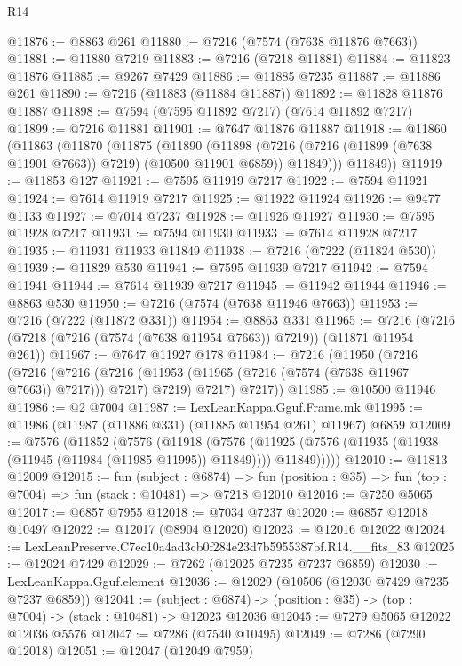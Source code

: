 \begin{lexlean}{R14}
\begin{coremodule}
@11876 := @8863 @261
@11880 := @7216 (@7574 (@7638 @11876 @7663))
@11881 := @11880 @7219
@11883 := @7216 (@7218 @11881)
@11884 := @11823 @11876
@11885 := @9267 @7429
@11886 := @11885 @7235
@11887 := @11886 @261
@11890 := @7216 (@11883 (@11884 @11887))
@11892 := @11828 @11876 @11887
@11898 := @7594 (@7595 @11892 @7217) (@7614 @11892 @7217)
@11899 := @7216 @11881
@11901 := @7647 @11876 @11887
@11918 := @11860
    (@11863
      (@11870
        (@11875
          (@11890
            (@11898
              (@7216 (@7216 (@11899 (@7638 @11901 @7663)) @7219) (@10500 @11901 @6859))
              @11849)))
        @11849))
@11919 := @11853 @127
@11921 := @7595 @11919 @7217
@11922 := @7594 @11921
@11924 := @7614 @11919 @7217
@11925 := @11922 @11924
@11926 := @9477 @1133
@11927 := @7014 @7237
@11928 := @11926 @11927
@11930 := @7595 @11928 @7217
@11931 := @7594 @11930
@11933 := @7614 @11928 @7217
@11935 := @11931 @11933 @11849
@11938 := @7216 (@7222 (@11824 @530))
@11939 := @11829 @530
@11941 := @7595 @11939 @7217
@11942 := @7594 @11941
@11944 := @7614 @11939 @7217
@11945 := @11942 @11944
@11946 := @8863 @530
@11950 := @7216 (@7574 (@7638 @11946 @7663))
@11953 := @7216 (@7222 (@11872 @331))
@11954 := @8863 @331
@11965 := @7216 (@7216 (@7218 (@7216 (@7574 (@7638 @11954 @7663)) @7219)) (@11871 @11954 @261))
@11967 := @7647 @11927 @178
@11984 := @7216
    (@11950
      (@7216
        (@7216
          (@7216 (@7216 (@11953 (@11965 (@7216 (@7574 (@7638 @11967 @7663)) @7217))) @7217) @7219)
          @7217)
        @7217))
@11985 := @10500 @11946
@11986 := @2 @7004
@11987 := LexLeanKappa.Gguf.Frame.mk
@11995 := @11986 (@11987 (@11886 @331) (@11885 @11954 @261) @11967) @6859
@12009 := @7576
    (@11852
      (@7576
        (@11918
          (@7576
            (@11925 (@7576 (@11935 (@11938 (@11945 (@11984 (@11985 @11995)) @11849)))) @11849)))))
@12010 := @11813 @12009
@12015 := fun (subject : @6874) =>
  fun (position : @35) => fun (top : @7004) => fun (stack : @10481) => @7218 @12010
@12016 := @7250 @5065
@12017 := @6857 @7955
@12018 := @7034 @7237
@12020 := @6857 @12018 @10497
@12022 := @12017 (@8904 @12020)
@12023 := @12016 @12022
@12024 := LexLeanPreserve.C7ec10a4ad3cb0f284e23d7b5955387bf.R14.__fits_83
@12025 := @12024 @7429
@12029 := @7262 (@12025 @7235 @7237 @6859)
@12030 := LexLeanKappa.Gguf.element
@12036 := @12029 (@10506 (@12030 @7429 @7235 @7237 @6859))
@12041 := (subject : @6874) ->
  (position : @35) -> (top : @7004) -> (stack : @10481) -> @12023 @12036
@12045 := @7279 @5065 @12022 @12036 @5576
@12047 := @7286 (@7540 @10495)
@12049 := @7286 (@7290 @12018)
@12051 := @12047 (@12049 @7959)

\end{coremodule}
\end{lexlean}
